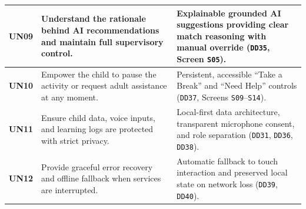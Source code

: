 \begin{xltabular}{\textwidth}{|p{1.8cm}|p{4.5cm}|X|}
\textbf{UN09} & Understand the rationale behind AI recommendations and maintain full supervisory control. & Explainable grounded AI suggestions providing clear match reasoning with manual override (\texttt{DD35}, Screen \texttt{S05}). \\ \hline
\textbf{UN10} & Empower the child to pause the activity or request adult assistance at any moment. & Persistent, accessible ``Take a Break'' and ``Need Help'' controls (\texttt{DD37}, Screens \texttt{S09}--\texttt{S14}). \\ \hline
\textbf{UN11} & Ensure child data, voice inputs, and learning logs are protected with strict privacy. & Local-first data architecture, transparent microphone consent, and role separation (\texttt{DD31}, \texttt{DD36}, \texttt{DD38}). \\ \hline
\textbf{UN12} & Provide graceful error recovery and offline fallback when services are interrupted. & Automatic fallback to touch interaction and preserved local state on network loss (\texttt{DD39}, \texttt{DD40}). \\ \hline
\end{xltabular}
\label{tab:c2_user_needs}

